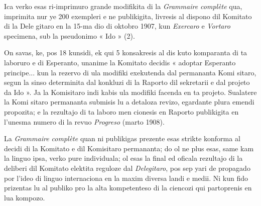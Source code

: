 \begin{VUpage}[9]{}

\VUsaut{5.0mm}

Ica verko esas ri-imprimuro grande modifikita di la\nl
\textit{Grammaire complète} qua, imprimita nur ye 200 exempleri\nl
e ne publikigita, livresis al dispono dil Komitato di la Dele\cc
gitaro en la 15-ma dio di oktobro 1907, kun \textit{Exercaro} e\nl
\textit{Vortaro} specimena, sub la pseudonimo « Ido » (2).

On savas, ke, pos 18 kunsidi, ek qui 5 konsakresis al dis\cc
kuto komparanta di ta laboruro e di Esperanto, unanime\nl
la Komitato decidis « adoptar Esperanto principe... kun la\nl
rezervo di ula modifiki exekutenda dal permananta Komi\cc
sitaro, segun la sinso determinita dal konkluzi di la Raporto\nl
dil sekretarii e dal projeto da Ido ». Ja la Komisitaro indi\cc
kabis ula modifiki facenda en ta projeto. Sualatere la Komi\cc
sitaro permananta submisis lu a detaloza revizo, egardante\nl
plura emendi propozita; e la rezultajo di ta laboro men\cc
cionesis en Raporto publikigita en l'unesma numero di la\nl
revuo \textit{Progreso} (marto 1908).

La \textit{Grammaire complète} quan ni publikigas prezente esas\nl
strikte konforma al decidi di la Komitato e dil Komisitaro\nl
permananta; do ol ne plus esas, same kam la linguo ipsa,\nl
verko pure individuala; ol esas la final ed oficala rezultajo\nl
di la deliberi dil Komitato elektita reguloze dal \textit{Delegitaro},\nl
pos sep yari de propagado por l'ideo di linguo internaciona\nl
en la maxim diversa landi e medii. Ni kun fido prizentas\nl
lu al publiko pro la alta kompetenteso di la ciencozi qui\nl
partoprenis en lua kompozo.
\end{VUpage}

